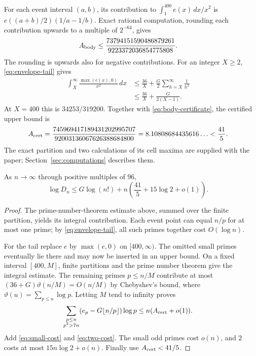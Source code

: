 For each event interval $(a,b)$, its contribution to
$\int_1^{400}e(x)\,dx/x^2$ is
$e((a+b)/2)(1/a-1/b)$. Exact rational computation, rounding each
contribution upwards to a multiple of $2^{-64}$, gives
\begin{equation}\label{eq:body-certificate}
 A_{\rm body}\le
 \frac{73794151590486879261}{9223372036854775808}.
\end{equation}
The rounding is upwards also for negative contributions.
For an integer $X\ge2$, \eqref{eq:envelope-tail} gives
\begin{align*}
 \int_X^\infty\frac{\max(e(x),0)}{x^2}\,dx
 &\le\frac{36}{X}+\frac G2\sum_{h=X}^\infty\frac1{h^2}\\
 &\le\frac{36}{X}+\frac{G}{2(X-1)}.
\end{align*}
At $X=400$ this is $34253/319200$. Together with
\eqref{eq:body-certificate}, the certified upper bound is
\begin{equation}\label{eq:A-certificate}
 A_{\rm cert}
 =\frac{745969417189431202995707}{92003136067626388684800}
 =8.10808684435616\ldots<\frac{41}{5}.
\end{equation}
The exact partition and two calculations of its cell maxima are
supplied with the paper; Section~\ref{sec:computations} describes them.

\begin{proposition}\label{prop:D-size}
As $n\to\infty$ through positive multiples of $96$,
\begin{equation}\label{eq:D-size}
 \log D_n\le G\log(n!)+n\left(\frac{41}{5}+15\log2+o(1)\right).
\end{equation}
\end{proposition}
\begin{proof}
The prime-number-theorem estimate above, summed over the finite
partition, yields its integral contribution.
Each event point can equal $n/p$ for at most one prime; by
\eqref{eq:envelope-tail}, all such primes together cost $O(\log n)$.

For the tail replace $e$ by $\max(e,0)$ on $[400,\infty)$.
The omitted small primes eventually lie there and may now be inserted
in an upper bound. On a fixed interval $[400,M]$, finite partitions
and the prime number theorem give the integral estimate. The remaining
primes $p\le n/M$ contribute at most
$(36+G)\vartheta(n/M)=O(n/M)$ by Chebyshev's bound, where
$\vartheta(u)=\sum_{p\le u}\log p$. Letting $M$ tend to infinity proves
\[
 \sum_{\substack{p\le n\\p^2>7n}}
     (e_p-G\lfloor n/p\rfloor)\log p
 \le n(A_{\rm cert}+o(1)).
\]
Add \eqref{eq:small-cost} and \eqref{eq:two-cost}. The small odd
primes cost $o(n)$, and $2$ costs at most $15n\log2+o(n)$.
Finally use $A_{\rm cert}<41/5$.
\end{proof}

